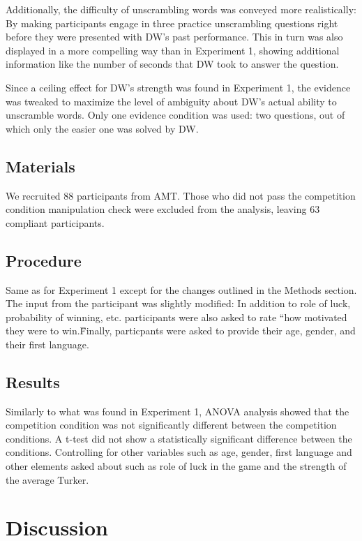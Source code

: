 \documentclass{article}
\begin{document}
Additionally, the difficulty of unscrambling words was conveyed more realistically: By making participants engage in three practice unscrambling questions right before they were presented with DW's past performance. This in turn was also displayed in a more compelling way than in Experiment 1, showing additional information like the number of seconds that DW took to answer the question.

Since a ceiling effect for DW's strength was found in Experiment 1, the evidence was tweaked to maximize the level of ambiguity about DW's actual ability to unscramble words. Only one evidence condition was used: two questions, out of which only the easier one was solved by DW.

\subsection{Materials}

We recruited 88 participants from AMT. Those who did not pass the competition condition manipulation check were excluded from the analysis, leaving 63 compliant participants.

\subsection{Procedure}

Same as for Experiment 1 except for the changes outlined in the Methods section. The input from the participant was slightly modified: In addition to role of luck, probability of winning, etc. participants were also asked to rate ``how motivated they were to win.\" Finally, particpants were asked to provide their age, gender, and their first language. 

\subsection{Results}


Similarly to what was found in Experiment 1, ANOVA analysis showed that the competition condition was not significantly different between the competition conditions. A t-test did not show a statistically significant difference between the conditions. Controlling for other variables such as age, gender, first language and other elements asked about such as role of luck in the game and the strength of the average Turker.


\section{Discussion}
\end{document}
